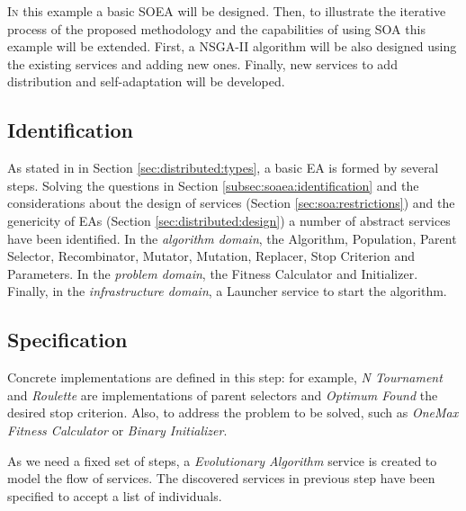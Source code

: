 \lettrine{I}{n} this example a basic SOEA will be designed. Then, to illustrate the iterative process of the proposed methodology and the capabilities of using SOA this example will be extended. First, a NSGA-II algorithm \cite{NSGA2} will be also designed using the existing services and adding new ones. Finally, new services to add distribution and self-adaptation will be developed. 

\subsection{Identification}
As  stated in in Section \ref{sec:distributed:types}, a basic EA is formed by several steps. Solving the questions in Section \ref{subsec:soaea:identification} and the considerations about the design of services (Section \ref{sec:soa:restrictions}) and the genericity of EAs (Section \ref{sec:distributed:design}) a number of abstract services have been identified. In the {\em algorithm domain}, the Algorithm, Population, Parent Selector, Recombinator, Mutator, Mutation, Replacer, Stop Criterion and Parameters. In the {\em problem domain}, the Fitness Calculator and Initializer. Finally, in the {\em infrastructure domain}, a Launcher service to start the algorithm. %



\subsection{Specification}

 Concrete implementations are defined in this step: for example, {\em N Tournament} and {\em Roulette} are implementations of parent selectors and {\em Optimum Found} the desired stop criterion. Also, to address the problem to be solved, such as {\em OneMax Fitness Calculator} or {\em Binary Initializer}. 

 As we need a fixed set of steps, a {\em Evolutionary Algorithm} service is created to model the flow of services. The discovered services in previous step have been specified to accept  a list of individuals. %

  

